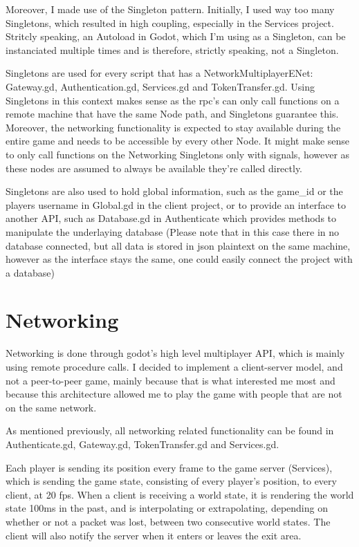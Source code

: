 \documentclass{article}
\begin{document}
\bigskip
Moreover, I made use of the Singleton pattern. Initially, I used way too many Singletons, which resulted in high coupling, especially in the Services project. Stritcly speaking, an Autoload in Godot, which I'm using as a Singleton, can be instanciated multiple times and is therefore, strictly speaking, not a Singleton.

Singletons are used for every script that has a NetworkMultiplayerENet: Gateway.gd, Authentication.gd, Services.gd and TokenTransfer.gd. Using Singletons in this context makes sense as the rpc's can only call functions on a remote machine that have the same Node path, and Singletons guarantee this. Moreover, the networking functionality is expected to stay available during the entire game and needs to be accessible by every other Node. It might make sense to only call functions on the Networking Singletons only with signals, however as these nodes are assumed to always be available they're called directly.

Singletons are also used to hold global information, such as the game\_id or the players username in Global.gd in the client project, or to provide an interface to another API, such as Database.gd in Authenticate which provides methods to manipulate the underlaying database (Please note that in this case there in no database connected, but all data is stored in json plaintext on the same machine, however as the interface stays the same, one could easily connect the project with a database)

\section{Networking}
Networking is done through godot's high level multiplayer API, which is mainly using remote procedure calls. I decided to implement a client-server model, and not a peer-to-peer game, mainly because that is what interested me most and because this architecture allowed me to play the game with people that are not on the same network.

As mentioned previously, all networking related functionality can be found in Authenticate.gd, Gateway.gd, TokenTransfer.gd and Services.gd.

Each player is sending its position every frame to the game server (Services), which is sending the game state, consisting of every player's position, to every client, at 20 fps. When a client is receiving a world state, it is rendering the world state 100ms in the past, and is  interpolating or extrapolating, depending on whether or not a packet was lost, between two consecutive world states. The client will also notify the server when it enters or leaves the exit area.
\end{document}
